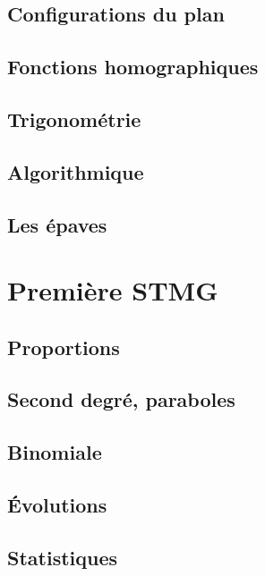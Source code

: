 \documentclass[a4paper,12pt]{book}
\begin{document}
\chapter{Configurations du plan}



\chapter{Fonctions homographiques}


\chapter{Trigonométrie}


\chapter{Algorithmique}


\chapter{Les épaves}


\part{Première STMG}
\chapter{Proportions}


\chapter{Second degré, paraboles}


\chapter{Binomiale}


\chapter{Évolutions}


\chapter{Statistiques}

\end{document}
